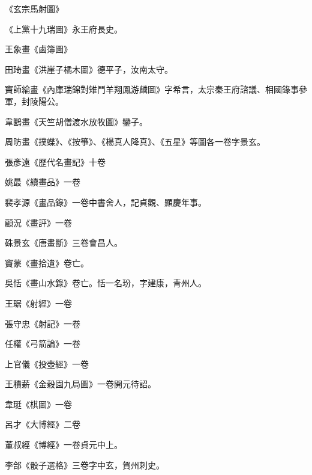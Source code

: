 \begin{pinyinscope}
 《玄宗馬射圖》



 《上黨十九瑞圖》永王府長史。



 王象畫《鹵簿圖》



 田琦畫《洪崖子橘木圖》德平子，汝南太守。



 竇師綸畫《內庫瑞錦對雉鬥羊翔鳳游麟圖》字希言，太宗秦王府諮議、相國錄事參軍，封陵陽公。



 韋鶠畫《天竺胡僧渡水放牧圖》鑾子。



 周昉畫《撲蝶》、《按箏》、《楊真人降真》、《五星》等圖各一卷字景玄。



 張彥遠《歷代名畫記》十卷



 姚最《續畫品》一卷



 裴孝源《畫品錄》一卷中書舍人，記貞觀、顯慶年事。



 顧況《畫評》一卷



 硃景玄《唐畫斷》三卷會昌人。



 竇蒙《畫拾遺》卷亡。



 吳恬《畫山水錄》卷亡。恬一名玢，字建康，青州人。



 王琚《射經》一卷



 張守忠《射記》一卷



 任權《弓箭論》一卷



 上官儀《投壺經》一卷



 王積薪《金穀園九局圖》一卷開元待詔。



 韋珽《棋圖》一卷



 呂才《大博經》二卷



 董叔經《博經》一卷貞元中上。



 李郃《骰子選格》三卷字中玄，賀州刺史。




\end{pinyinscope}
